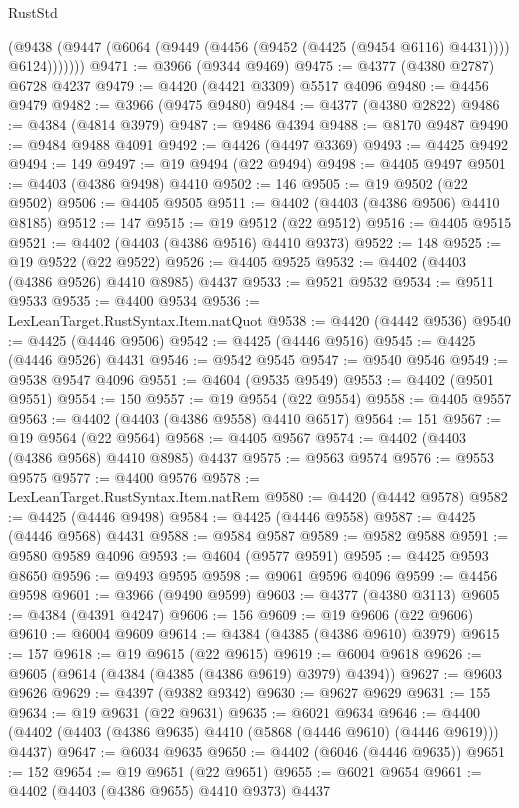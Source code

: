 \begin{lexlean}{RustStd}
\begin{coremodule}
            (@9438 (@9447 (@6064 (@9449 (@4456 (@9452 (@4425 (@9454 @6116) @4431)))) @6124)))))))
@9471 := @3966 (@9344 @9469)
@9475 := @4377 (@4380 @2787) @6728 @4237
@9479 := @4420 (@4421 @3309) @5517 @4096
@9480 := @4456 @9479
@9482 := @3966 (@9475 @9480)
@9484 := @4377 (@4380 @2822)
@9486 := @4384 (@4814 @3979)
@9487 := @9486 @4394
@9488 := @8170 @9487
@9490 := @9484 @9488 @4091
@9492 := @4426 (@4497 @3369)
@9493 := @4425 @9492
@9494 := 149
@9497 := @19 @9494 (@22 @9494)
@9498 := @4405 @9497
@9501 := @4403 (@4386 @9498) @4410
@9502 := 146
@9505 := @19 @9502 (@22 @9502)
@9506 := @4405 @9505
@9511 := @4402 (@4403 (@4386 @9506) @4410 @8185)
@9512 := 147
@9515 := @19 @9512 (@22 @9512)
@9516 := @4405 @9515
@9521 := @4402 (@4403 (@4386 @9516) @4410 @9373)
@9522 := 148
@9525 := @19 @9522 (@22 @9522)
@9526 := @4405 @9525
@9532 := @4402 (@4403 (@4386 @9526) @4410 @8985) @4437
@9533 := @9521 @9532
@9534 := @9511 @9533
@9535 := @4400 @9534
@9536 := LexLeanTarget.RustSyntax.Item.natQuot
@9538 := @4420 (@4442 @9536)
@9540 := @4425 (@4446 @9506)
@9542 := @4425 (@4446 @9516)
@9545 := @4425 (@4446 @9526) @4431
@9546 := @9542 @9545
@9547 := @9540 @9546
@9549 := @9538 @9547 @4096
@9551 := @4604 (@9535 @9549)
@9553 := @4402 (@9501 @9551)
@9554 := 150
@9557 := @19 @9554 (@22 @9554)
@9558 := @4405 @9557
@9563 := @4402 (@4403 (@4386 @9558) @4410 @6517)
@9564 := 151
@9567 := @19 @9564 (@22 @9564)
@9568 := @4405 @9567
@9574 := @4402 (@4403 (@4386 @9568) @4410 @8985) @4437
@9575 := @9563 @9574
@9576 := @9553 @9575
@9577 := @4400 @9576
@9578 := LexLeanTarget.RustSyntax.Item.natRem
@9580 := @4420 (@4442 @9578)
@9582 := @4425 (@4446 @9498)
@9584 := @4425 (@4446 @9558)
@9587 := @4425 (@4446 @9568) @4431
@9588 := @9584 @9587
@9589 := @9582 @9588
@9591 := @9580 @9589 @4096
@9593 := @4604 (@9577 @9591)
@9595 := @4425 @9593 @8650
@9596 := @9493 @9595
@9598 := @9061 @9596 @4096
@9599 := @4456 @9598
@9601 := @3966 (@9490 @9599)
@9603 := @4377 (@4380 @3113)
@9605 := @4384 (@4391 @4247)
@9606 := 156
@9609 := @19 @9606 (@22 @9606)
@9610 := @6004 @9609
@9614 := @4384 (@4385 (@4386 @9610) @3979)
@9615 := 157
@9618 := @19 @9615 (@22 @9615)
@9619 := @6004 @9618
@9626 := @9605 (@9614 (@4384 (@4385 (@4386 @9619) @3979) @4394))
@9627 := @9603 @9626
@9629 := @4397 (@9382 @9342)
@9630 := @9627 @9629
@9631 := 155
@9634 := @19 @9631 (@22 @9631)
@9635 := @6021 @9634
@9646 := @4400 (@4402 (@4403 (@4386 @9635) @4410 (@5868 (@4446 @9610) (@4446 @9619))) @4437)
@9647 := @6034 @9635
@9650 := @4402 (@6046 (@4446 @9635))
@9651 := 152
@9654 := @19 @9651 (@22 @9651)
@9655 := @6021 @9654
@9661 := @4402 (@4403 (@4386 @9655) @4410 @9373) @4437

\end{coremodule}
\end{lexlean}
